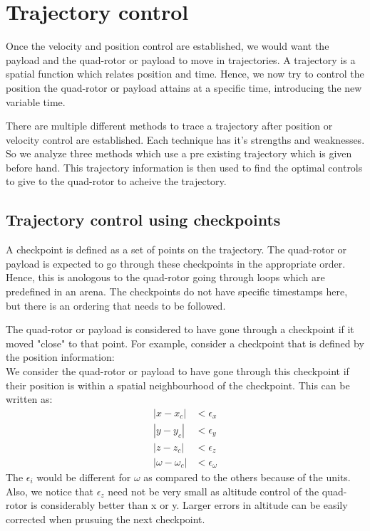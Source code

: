 \documentclass[hidelinks,BTech]{iitmdiss}
\begin{document}
\chapter{Trajectory control}

Once the velocity and position control are established, we would want the payload and the quad-rotor or payload to move in trajectories. A trajectory is a spatial function which relates position and time. Hence, we now try to control the position the quad-rotor or payload attains at a specific time, introducing the new variable time.

There are multiple different methods to trace a trajectory after position or velocity control are established. Each technique has it's strengths and weaknesses. So we analyze three methods which use a pre existing trajectory which is given before hand. This trajectory information is then used to find the optimal controls to give to the quad-rotor to acheive the trajectory.

\section{Trajectory control using checkpoints}

A checkpoint is defined as a set of points on the trajectory. The quad-rotor or payload is expected to go through these checkpoints in the appropriate order. Hence, this is anologous to the quad-rotor going through loops which are predefined in an arena. The checkpoints do not have specific timestamps here, but there is an ordering that needs to be followed.

The quad-rotor or payload is considered to have gone through a checkpoint if it moved "close" to that point. For example, consider a checkpoint that is defined by the position information:
\begin{equation}
  [x_c, y_c, z_y, \omega_c]
\end{equation}
We consider the quad-rotor or payload to have gone through this checkpoint if their position is within a spatial neighbourhood of the checkpoint. This can be written as:
\begin{equation} \begin{split}
  |x - x_c| &< \epsilon_x \\
  |y - y_c| &< \epsilon_y \\
  |z - z_c| &< \epsilon_z \\
  |\omega - \omega_c| &< \epsilon_\omega
\end{split} \end{equation}
The $\epsilon_i$ would be different for $\omega$ as compared to the others because of the units. Also, we notice that $\epsilon_z$ need not be very small as altitude control of the quad-rotor is considerably better than x or y. Larger errors in altitude can be easily corrected when prusuing the next checkpoint.
\end{document}
